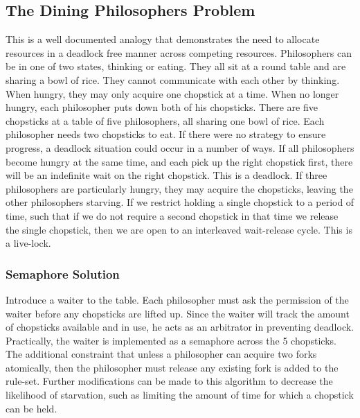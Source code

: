 \documentclass[10pt,a4paper]{article}
\begin{document}
\subsection{The Dining Philosophers Problem}
This is a well documented analogy that demonstrates the need to allocate resources in a deadlock free manner across competing resources. Philosophers  can be in one of two states, thinking or eating. They all sit at a round table and are sharing a bowl of rice. They cannot communicate with each other by thinking. When hungry, they may only acquire one chopstick at a time. When no longer hungry, each philosopher puts down both of his chopsticks. There are five chopsticks at a table of five philosophers, all sharing one bowl of rice. Each philosopher needs two chopsticks to eat. If there were no strategy to ensure progress, a deadlock situation could occur in a number of ways. If all philosophers become hungry at the same time, and each pick up the right chopstick first, there will be an indefinite wait on the right chopstick. This is a deadlock. If three philosophers are particularly hungry, they may acquire the chopsticks, leaving the other philosophers starving. If we restrict holding a single chopstick to a period of time, such that if we do not require a second chopstick in that time we release the single chopstick, then we are open to an interleaved wait-release cycle. This is a live-lock. 
\subsubsection{Semaphore Solution}
Introduce a waiter to the table. Each philosopher must ask the permission of the waiter before any chopsticks are lifted up. Since the waiter will track the amount of chopsticks available and in use, he acts as an arbitrator in preventing deadlock. Practically, the waiter is implemented as a semaphore across the 5 chopsticks. The additional constraint that unless a philosopher can acquire two forks atomically, then the philosopher must release any existing fork is added to the rule-set. Further modifications can be made to this algorithm to decrease the likelihood of starvation, such as limiting the amount of time for which a chopstick can be  held. 
\end{document}
